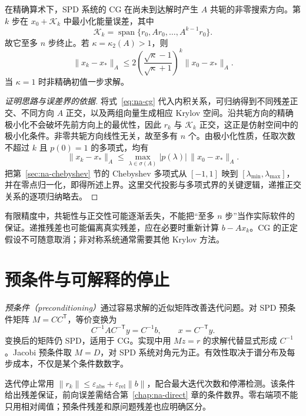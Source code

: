 \begin{theorem}[CG 的投影性质与误差界]
\label{thm:na-cg}
在精确算术下，SPD 系统的 CG 在尚未到达解时产生 $A$ 共轭的非零搜索方向。第 $k$ 步在 $x_0+\mathcal K_k$ 中最小化能量误差，其中
\[
 \mathcal K_k=\operatorname{span}\{r_0,Ar_0,\ldots,A^{k-1}r_0\}.
\]
故它至多 $n$ 步终止。若 $\kappa=\kappa_2(A)>1$，则
\[
 \|x_k-x_*\|_A\le
 2\left(\frac{\sqrt\kappa-1}{\sqrt\kappa+1}\right)^k\|x_0-x_*\|_A.
\]
当 $\kappa=1$ 时非精确初值一步求解。
\end{theorem}
\begin{proof}[证明思路与误差界的依据]
将式~\eqref{eq:na-cg} 代入内积关系，可归纳得到不同残差正交、不同方向 $A$ 正交，以及两组向量生成相应 Krylov 空间。沿共轭方向的精确极小化不会破坏先前方向上的最优性，因此 $r_k$ 与 $\mathcal K_k$ 正交，这正是仿射空间中的极小化条件。非零共轭方向线性无关，故至多有 $n$ 个。由极小化性质，任取次数不超过 $k$ 且 $p(0)=1$ 的多项式，均有
\[
 \|x_k-x_*\|_A\le\max_{\lambda\in\sigma(A)}|p(\lambda)|\,\|x_0-x_*\|_A.
\]
把第~\ref{sec:na-chebyshev} 节的 Chebyshev 多项式从 $[-1,1]$ 映到 $[\lambda_{\min},\lambda_{\max}]$，并在零点归一化，即得所述上界。这里交代投影与多项式界的关键逻辑，递推正交关系的逐项归纳略去。
\end{proof}

有限精度中，共轭性与正交性可能逐渐丢失，不能把“至多 $n$ 步”当作实际软件的保证。递推残差也可能偏离真实残差，应在必要时重新计算 $b-Ax_k$。CG 的正定假设不可随意取消；非对称系统通常需要其他 Krylov 方法。

\section{预条件与可解释的停止}
\emph{预条件（preconditioning）}通过容易求解的近似矩阵改善迭代问题。对 SPD 预条件矩阵 $M=CC^{\mathsf T}$，等价变换为
\[
 C^{-1}AC^{-\mathsf T}y=C^{-1}b,\qquad x=C^{-\mathsf T}y.
\]
变换后的矩阵仍 SPD，适用于 CG。实现中用 $Mz=r$ 的求解代替显式形成 $C^{-1}$。Jacobi 预条件取 $M=D$，对 SPD 系统对角元为正。有效性取决于谱分布及每步成本，不仅是某个条件数数字。

迭代停止常用 $\|r_k\|\le\varepsilon_{\mathrm{abs}}+\varepsilon_{\mathrm{rel}}\|b\|$，配合最大迭代次数和停滞检测。该条件给出残差保证，前向误差需结合第~\ref{chap:na-direct} 章的条件数界。零右端项不能只用相对阈值；预条件残差和原问题残差也应明确区分。

